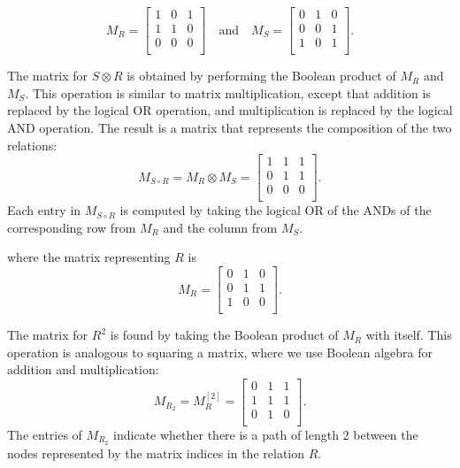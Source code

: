 	\begin{example}
		$$
		M_R = \begin{bmatrix}
			1 & 0 & 1 \\
			1 & 1 & 0 \\
			0 & 0 & 0 \\
		\end{bmatrix}
		\quad \text{and} \quad
		M_S = \begin{bmatrix}
			0 & 1 & 0 \\
			0 & 0 & 1 \\
			1 & 0 & 1 \\
		\end{bmatrix}.
		$$
	\end{example}
	\begin{solution}
		The matrix for $S \otimes R$ is obtained by performing the Boolean product of $M_R$ and $M_S$. This operation is similar to matrix multiplication, except that addition is replaced by the logical OR operation, and multiplication is replaced by the logical AND operation. The result is a matrix that represents the composition of the two relations:
		$$
		M_{S \circ R} = M_R \otimes M_S = \begin{bmatrix}
			1 & 1 & 1 \\
			0 & 1 & 1 \\
			0 & 0 & 0 \\
		\end{bmatrix}.
		$$
		Each entry in $M_{S \circ R}$ is computed by taking the logical OR of the ANDs of the corresponding row from $M_R$ and the column from $M_S$.
	\end{solution}
	\begin{example}
		where the matrix representing $R$ is
		$$
		M_R = \begin{bmatrix}
			0 & 1 & 0 \\
			0 & 1 & 1 \\
			1 & 0 & 0 \\
		\end{bmatrix}.
		$$
	\end{example}
	\begin{solution}
		The matrix for $R^2$ is found by taking the Boolean product of $M_R$ with itself. This operation is analogous to squaring a matrix, where we use Boolean algebra for addition and multiplication:
		$$
		M_{R_2} = M_{R}^{[2]} = \begin{bmatrix}
			0 & 1 & 1 \\
			1 & 1 & 1 \\
			0 & 1 & 0 \\
		\end{bmatrix}.
		$$
		The entries of $M_{R_2}$ indicate whether there is a path of length 2 between the nodes represented by the matrix indices in the relation $R$.
	\end{solution}
